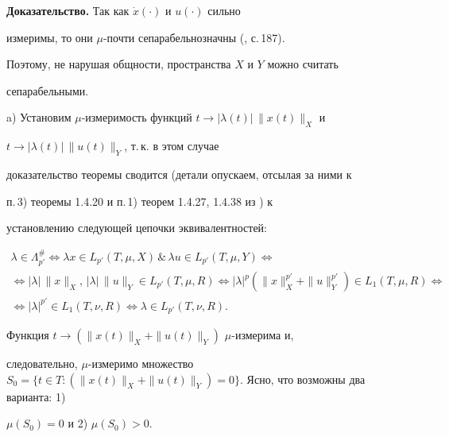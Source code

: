  


{\bf Доказательство.} Так как $\Dot x(\cdot)$ и $u(\cdot)$ сильно 


измеримы, то они $\mu$-почти сепарабельнозначны (\cite{12}, с.\,187). 


Поэтому, не нарушая общности, пространства $X$ и $Y$ можно считать 


сепарабельными. 


 


a) Установим $\mu$-измеримость функций $t\to|\lambda(t)|\,\|x(t)\|_X$ и 


$t\to|\lambda(t)|\,\|u(t)\|_Y$, т.\,к. в этом случае 


доказательство теоремы сводится (детали опускаем, отсылая за ними к 


п.\,3) теоремы 1.4.20 и п.\,1) теорем 1.4.27, 1.4.38 из \cite{14}) к 


установлению следующей цепочки эквивалентностей: 


\begin{multline*} 


\lambda\in\Lambda^{\#}_{p'}\Longleftrightarrow \lambda x\in 


L_{p'}(T,\mu,X)\,\&\, \lambda u\in L_{p'}(T,\mu,Y) 


\Longleftrightarrow \\ 


% 


\Longleftrightarrow|\lambda|\,\|x\|_X,\,|\lambda|\,\|u\|_Y\in 


L_{p'}(T,\mu,R)\Longleftrightarrow |\lambda|^p 


(\|x\|^{p'}_X+\|u\|^{p'}_Y)\in L_1(T,\mu,R)\Longleftrightarrow \\ 


% 


\Longleftrightarrow|\lambda|^{p'}\in L_1(T,\nu,R)\Longleftrightarrow 


\lambda\in L_{p'}(T,\nu,R). 


\end{multline*} 


 


Функция $t\to(\|x(t)\|_X+\|u(t)\|_Y)$\; $\mu$-измерима и, 


следовательно, $\mu$-измеримо множество $S_0=\{t\in 


T:(\|x(t)\|_X+\|u(t)\|_Y)=0\}$. Ясно, что возможны два варианта: 1) 


$\mu(S_0)=0$ и 2) $\mu(S_0)>0$. 


